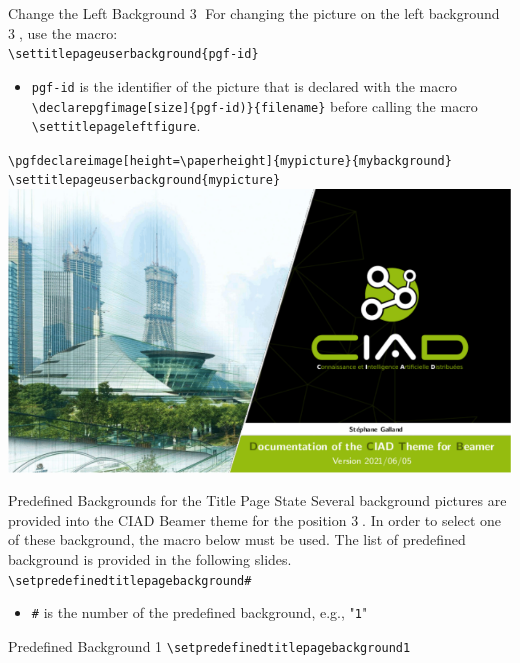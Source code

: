 \documentclass[english,sectioncirclenumberstyle]{ciadbeamer}
\begin{document}
\begin{frame}[t]{Change the Left Background \textcircled{3}}
	\smaller For changing the picture on the left background \textcircled{3}, use the macro: \\[.25cm]
	\texttt{{\textbackslash}settitlepageuserbackground\{pgf-id\}} \\[.25cm]
	\begin{itemize}
		\item \texttt{pgf-id} is the identifier of the picture that is declared with the macro \texttt{{\textbackslash}declarepgfimage[size]\{pgf-id)\}\{filename\}} before calling the macro \texttt{{\textbackslash}settitlepageleftfigure}.
	\end{itemize}
	\begin{example}
		\texttt{{\textbackslash}pgfdeclareimage[height={\textbackslash}paperheight]\{mypicture\}\{mybackground\}} \\
		\texttt{{\textbackslash}settitlepageuserbackground\{mypicture\}} \\
		\centering\includegraphics[width=.25\linewidth]{frontpage3}
	\end{example}
\end{frame}

\begin{frame}{{Predefined Backgrounds} for the Title Page State}
	Several background pictures are provided into the CIAD Beamer theme for the position \textcircled{3}. In order to select one of these background, the macro below must be used. The list of predefined background is provided in the following slides. \\[.5cm]
	\texttt{{\textbackslash}setpredefinedtitlepagebackground{\#}} \\[.5cm]
	\begin{itemize}
		\item \texttt{\#} is the number of the predefined background, e.g., "\texttt{1}"
	\end{itemize}
\end{frame}

\begin{frame}{{Predefined Background} 1}
	\centering\texttt{{\textbackslash}setpredefinedtitlepagebackground1} \\[.5cm]
\end{frame}
\end{document}
